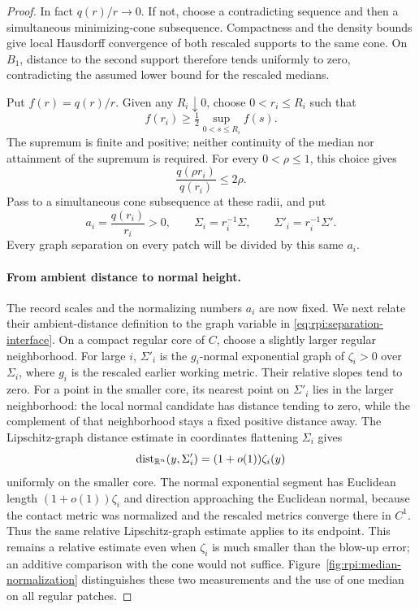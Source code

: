 \begin{proof}
In fact $q(r)/r\to0$. If not, choose a contradicting sequence and
then a simultaneous minimizing-cone subsequence. Compactness and the
density bounds give local Hausdorff convergence of both rescaled
supports to the same cone. On $B_1$, distance to the second support
therefore tends uniformly to zero, contradicting the assumed lower
bound for the rescaled medians.

Put $f(r)=q(r)/r$. Given any $R_i\downarrow0$, choose $0<r_i\le R_i$
such that
\[
 f(r_i)\ge\tfrac12\sup_{0<s\le R_i}f(s).
\]
The supremum is finite and positive; neither continuity of the median
nor attainment of the supremum is required. For every $0<\rho\le1$,
this choice gives
\begin{equation}\label{eq:rpi:median-record}
 \frac{q(\rho r_i)}{q(r_i)}\le2\rho.
\end{equation}
Pass to a simultaneous cone subsequence at these radii, and put
\[
 a_i=\frac{q(r_i)}{r_i}>0,
 \qquad \Sigma_i=r_i^{-1}\Sigma,
 \qquad \Sigma'_i=r_i^{-1}\Sigma'.
\]
Every graph separation on every patch will be divided by this same
$a_i$.

\paragraph{From ambient distance to normal height.}
The record scales and the normalizing numbers $a_i$ are now fixed.
We next relate their ambient-distance definition to the graph variable
in \eqref{eq:rpi:separation-interface}. On a compact regular core of $C$,
choose a slightly larger regular neighborhood. For large $i$,
$\Sigma'_i$ is the $g_i$-normal exponential graph of $\zeta_i>0$
over $\Sigma_i$, where $g_i$ is the rescaled earlier working metric.
Their relative slopes tend to zero. For a point in the smaller core,
its nearest point on $\Sigma'_i$ lies in the larger neighborhood:
the local normal candidate has distance tending to zero, while the
complement of that neighborhood stays a fixed positive distance away.
The Lipschitz-graph distance estimate in coordinates flattening
$\Sigma_i$ gives
\begin{equation}\label{eq:rpi:distance-height}
 \operatorname{dist}_{\mathbb R^n}(y,\Sigma'_i)=(1+o(1))\zeta_i(y)
\end{equation}
uniformly on the smaller core. The normal exponential segment has
Euclidean length $(1+o(1))\zeta_i$ and direction approaching the
Euclidean normal, because the contact metric was normalized and the
rescaled metrics converge there in $C^1$. Thus the same relative
Lipschitz-graph estimate applies to its endpoint. This remains a
relative estimate even when $\zeta_i$ is much smaller than the
blow-up error; an additive comparison with the cone would not suffice.
Figure~\ref{fig:rpi:median-normalization} distinguishes these two
measurements and the use of one median on all regular patches.


\end{proof}
